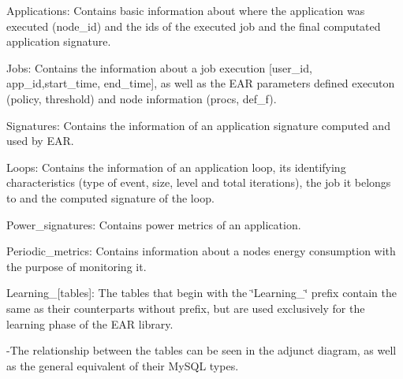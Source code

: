 \begin{DoxyItemize}
\item Applications\+: Contains basic information about where the application was executed (node\+\_\+id) and the id\textquotesingle{}s of the executed job and the final computated application signature.
\begin{DoxyItemize}
\item Jobs\+: Contains the information about a job execution \mbox{[}user\+\_\+id, app\+\_\+id,start\+\_\+time, end\+\_\+time\mbox{]}, as well as the E\+AR parameters defined executon (policy, threshold) and node information (procs, def\+\_\+f).
\item Signatures\+: Contains the information of an application signature computed and used by E\+AR.
\item Loops\+: Contains the information of an application loop, its identifying characteristics (type of event, size, level and total iterations), the job it belongs to and the computed signature of the loop.
\item Power\+\_\+signatures\+: Contains power metrics of an application.
\item Periodic\+\_\+metrics\+: Contains information about a node\textquotesingle{}s energy consumption with the purpose of monitoring it.
\item Learning\+\_\+\mbox{[}tables\mbox{]}\+: The tables that begin with the \char`\"{}\+Learning\+\_\+\char`\"{} prefix contain the same as their counterparts without prefix, but are used exclusively for the learning phase of the E\+AR library.
\end{DoxyItemize}
\end{DoxyItemize}

-\/\+The relationship between the tables can be seen in the adjunct diagram, as well as the general equivalent of their My\+S\+QL types. 